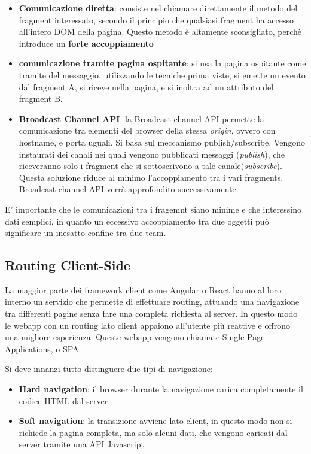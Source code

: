 \begin{itemize}
    \item \textbf{Comunicazione diretta}: consiste nel chiamare direttamente il metodo del fragment
    interessato, secondo il principio che qualsiasi fragment ha accesso all'intero DOM della pagina.
    Questo metodo è altamente sconsigliato, perchè introduce un \textbf{forte accoppiamento}
    \item \textbf{comunicazione tramite pagina ospitante}: si usa la pagina ospitante come tramite del messaggio,
    utilizzando le tecniche prima viste, si emette un evento dal fragment A, si riceve nella pagina, e si inoltra ad un attributo 
    del fragment B.
    \item \textbf{Broadcast Channel API}: la Broadcast channel API permette la comunicazione 
    tra elementi del browser della stessa \emph{origin}, ovvero con hostname, e porta uguali. 
    Si basa sul meccanismo publish/subscribe.
    Vengono instaurati dei canali nei quali vengono pubblicati messaggi (\emph{publish}), 
    che riceveranno solo i fragment che si sottoscrivono a tale canale(\emph{subscribe}).
    Questa soluzione riduce al minimo l'accoppiamento tra i vari fragments.
    Broadcast channel API verrà approfondito successivamente.
\end{itemize}

E' importante che le comunicazioni tra i fragemnt siano minime e che interessino dati semplici, in quanto
un eccessivo accoppiamento tra due oggetti può significare un inesatto confine tra due team.

\pagebreak
\subsection{Routing Client-Side }
La maggior parte dei framework client come Angular o React hanno al loro interno un servizio che permette di
effettuare routing, attuando una navigazione tra differenti pagine senza fare una completa richiesta al server.
In questo modo le webapp con un routing lato client appaiono all'utente più reattive e offrono una migliore esperienza.
Queste webapp vengono chiamate Single Page Applications, o SPA.

Si deve innanzi tutto distinguere due tipi di navigazione:
\begin{itemize}
    \item \textbf{Hard navigation}: il browser durante la navigazione carica completamente il codice HTML dal server
    \item \textbf{Soft navigation}: la transizione avviene lato client, in questo modo non si richiede la pagina completa,
     ma solo alcuni dati, che vengono caricati dal server tramite una API Javascript
\end{itemize}

